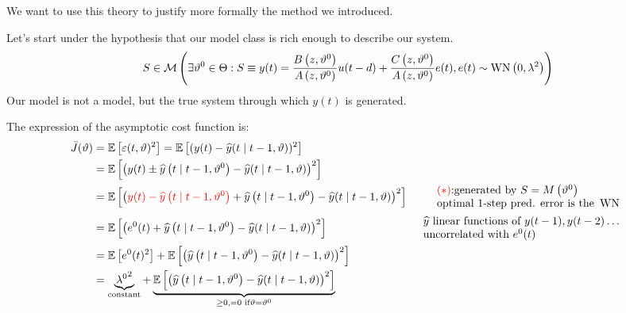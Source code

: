 We want to use this theory to justify more formally the method we introduced.

Let's start under the hypothesis that our model class is rich enough to describe our system.
\begin{equation*}
S\in \mathcal{M} \left(\exists \vartheta ^{0} \in \Theta :S\equiv y(t) =\frac{B\left(z,\vartheta ^{0}\right)}{A\left(z,\vartheta ^{0}\right)} u(t-d) +\frac{C\left(z,\vartheta ^{0}\right)}{A\left(z,\vartheta ^{0}\right)} e(t) ,e(t) \sim \operatorname{WN} \left(0,\lambda ^{2}\right)\right)
\end{equation*}
Our model is not a model, but the true system through which $ y(t)$ is generated.

The expression of the asymptotic cost function is:
\begin{equation*}
\begin{aligned}
\bar{J}(\theta) & =\E\left[ \varepsilon (t,\theta)^{2}\right] =\E\left[(y(t) -\hat{y}(t\mid t-1,\theta))^{2}\right] & \\
 & =\E\left[\left(y(t) \pm \hat{y}\left(t\mid t-1,\theta ^{0}\right) -\hat{y}(t\mid t-1,\theta)\right)^{2}\right] & \\
 & =\E\left[\left(\textcolor[rgb]{1,0,0}{y(t) -\hat{y}\left(t\mid t-1,\theta^{0}\right)} +\hat{y}\left(t\mid t-1,\theta ^{0}\right) -\hat{y}(t\mid t-1,\theta)\right)^{2}\right] &  \begin{array}{l}
\textcolor[rgb]{1,0,0}{(*)}\text{:generated by } S=M\left(\theta ^{0}\right)\\
\text{optimal 1-step pred. error is the } \WN
\end{array}\\
 & =\E\left[\left(e^{0}(t) +\hat{y}\left(t\mid t-1,\theta ^{0}\right) -\hat{y}(t\mid t-1,\theta)\right)^{2}\right] &  \begin{array}{l}
\hat{y} \text{ linear functions of } y(t-1),y(t-2) \ldots\\
\text{uncorrelated with } e^{0}(t)
\end{array}\\
 & =\E\left[ e^{0}(t)^{2}\right] +\E\left[\left(\hat{y}\left(t\mid t-1,\theta ^{0}\right) -\hat{y}(t\mid t-1,\theta)\right)^{2}\right] & \\
 & =\underbrace{\lambda {^{0}}^{2}}_{\text{constant}} +\underbrace{\E\left[\left(\hat{y}\left(t\mid t-1,\theta ^{0}\right) -\hat{y}(t\mid t-1,\theta)\right)^{2}\right]}_{\geq 0,=0\text{ if} \theta =\theta ^{0}} & 
\end{aligned}
\end{equation*}

